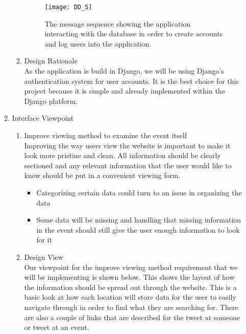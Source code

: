 \documentclass[draftclsnofoot,10pt,onecolumn]{IEEEtran} %
\begin{document}
\begin{enumerate}
\begin{enumerate}
\begin{enumerate}
				\begin{figure}[H]
  					\begin{center}
						\texttt{[image: DD\_5]}
						\captionsetup{width=.4\linewidth}
						\centering
  						\caption{The message sequence showing the application interacting with the database in order to 
  						create accounts and log users into the application.}
  					\end{center}
				\end{figure}
				
				\item Design Rationale \\
				As the application is build in Django, we will be using Django's authentication system for user accounts. It
				is the best choice for this project because it is simple and already implemented within the Django platform. \\
			\end{enumerate}
			
		\item Interface Viewpoint \\
			\begin{enumerate}
				\item Improve viewing method to examine the event itself \\
				Improving the way users view the website is important to make it look more pristine and clean. All
				information should be clearly sectioned and any relevant information that the user would like to know
				should be put in a convenient viewing form.
				\begin{itemize}
					\item Categorizing certain data could turn to an issue in organizing the data
					\item Some data will be missing and handling that missing information in the event should still give the
					user enough information to look for it \\
				\end{itemize}
				
				\item Design View \\ %
				Our viewpoint for the improve viewing method requirement that we will be implementing is shown below.
				This shows the layout of how the information should be spread out through the website. This is a basic look
				at how each location will store data for the user to easily navigate through in order to find what they are
				searching for. There are also a couple of links that are described for the tweet at someone or tweet at an
				event. \\
				

\end{enumerate}
\end{enumerate}
\end{enumerate}
\end{document}
